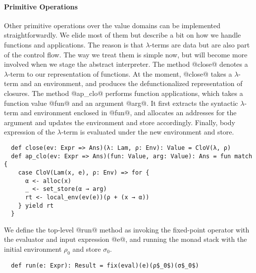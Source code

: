 \paragraph{Primitive Operations}
Other primitive operations over the value domains can be implemented
straightforwardly. We elide most of them but describe a bit on how we handle
functions and applications. The reason is that $\lambda$-terms are data but are also
part of the control flow. The way we treat them is simple now, but
will become more involved when we stage the abstract interpreter.
The method @close@ denotes a $\lambda$-term to our representation of functions.
At the moment, @close@ takes a $\lambda$-term and an environment, and
produces the defunctionalized representation of closures.
The method @ap_clo@ performs function applications, which takes a function
value @fun@ and an argument @arg@. It first extracts the syntactic
$\lambda$-term and environment enclosed in @fun@, and allocates an addresses
for the argument and updates the environment and store accordingly.  Finally,
body expression of the $\lambda$-term is evaluated under the new environment
and store.
\begin{lstlisting}
  def close(ev: Expr => Ans)(λ: Lam, ρ: Env): Value = CloV(λ, ρ)
  def ap_clo(ev: Expr => Ans)(fun: Value, arg: Value): Ans = fun match {
    case CloV(Lam(x, e), ρ: Env) => for {
      α <- alloc(x)
      _ <- set_store(α → arg)
      rt <- local_env(ev(e))(ρ + (x → α))
    } yield rt
  }
\end{lstlisting}


We define the top-level @run@ method as invoking the fixed-point operator with
the evaluator and input expression @e@, and running the monad stack with the
initial environment $\rho_0$ and store $\sigma_0$.
\begin{lstlisting}
  def run(e: Expr): Result = fix(eval)(e)(ρ$_0$)(σ$_0$)
\end{lstlisting}
